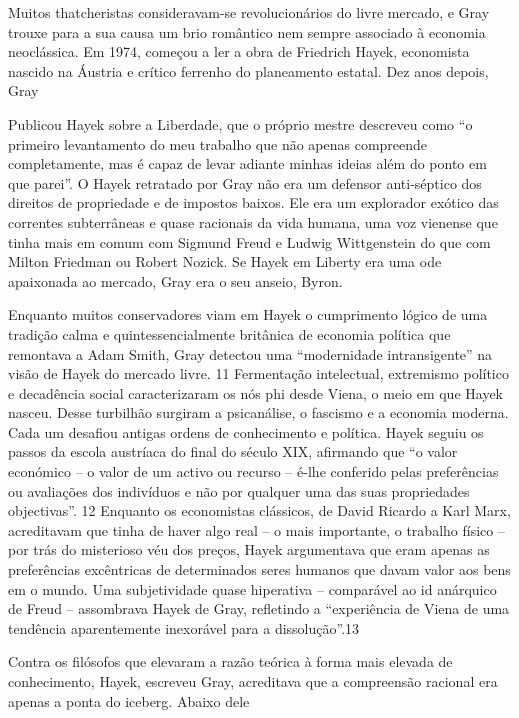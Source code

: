  \par 
Muitos thatcheristas consideravam-se revolucionários do livre mercado, e Gray trouxe para a sua causa um brio romântico nem sempre associado à economia neoclássica. Em 1974, começou a ler a obra de Friedrich Hayek, economista nascido na Áustria e crítico ferrenho do planeamento estatal. Dez anos depois, Gray
 \par 
Publicou Hayek sobre a Liberdade, que o próprio mestre descreveu como “o primeiro levantamento do meu trabalho que não apenas compreende completamente, mas é capaz de levar adiante minhas ideias além do ponto em que parei”. O Hayek retratado por Gray não era um defensor anti-séptico dos direitos de propriedade e de impostos baixos. Ele era um explorador exótico das correntes subterrâneas e quase racionais da vida humana, uma voz vienense que tinha mais em comum com Sigmund Freud e Ludwig Wittgenstein do que com Milton Friedman ou Robert Nozick. Se Hayek em Liberty era uma ode apaixonada ao mercado, Gray era o seu anseio, Byron.
 \par 
Enquanto muitos conservadores viam em Hayek o cumprimento lógico de uma tradição calma e quintessencialmente britânica de economia política que remontava a Adam Smith, Gray detectou uma “modernidade intransigente” na visão de Hayek do mercado livre. {\color{blue}11} Fermentação intelectual, extremismo político e decadência social caracterizaram os nós phi desde Viena, o meio em que Hayek nasceu. Desse turbilhão surgiram a psicanálise, o fascismo e a economia moderna. Cada um desafiou antigas ordens de conhecimento e política. Hayek seguiu os passos da escola austríaca do final do século XIX, afirmando que “o valor económico – o valor de um activo ou recurso – é-lhe conferido pelas preferências ou avaliações dos indivíduos e não por qualquer uma das suas propriedades objectivas”. {\color{blue}12} Enquanto os economistas clássicos, de David Ricardo a Karl Marx, acreditavam que tinha de haver algo real – o mais importante, o trabalho físico – por trás do misterioso véu dos preços, Hayek argumentava que eram apenas as preferências excêntricas de determinados seres humanos que davam valor aos bens em o mundo. Uma subjetividade quase hiperativa – comparável ao id anárquico de Freud – assombrava Hayek de Gray, refletindo a “experiência de Viena de uma tendência aparentemente inexorável para a dissolução”.{\color{blue}13}
 \par 
Contra os filósofos que elevaram a razão teórica à forma mais elevada de conhecimento, Hayek, escreveu Gray, acreditava que a compreensão racional era apenas a ponta do iceberg. Abaixo dele

